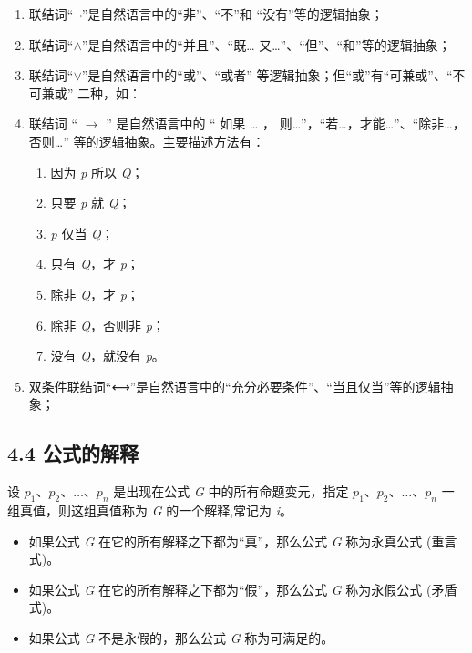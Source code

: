 \begin{enumerate}
\def\labelenumi{\arabic{enumi}.}
\tightlist
\item
  联结词``\(\lnot\)''是自然语言中的``非''、``不''和
  ``没有''等的逻辑抽象；
\item
  联结词``\(\land\)''是自然语言中的``并且''、``既\ldots{}
  又\ldots''、``但''、``和''等的逻辑抽象；
\item
  联结词``\(\lor\)''是自然语言中的``或''、``或者''
  等逻辑抽象；但``或''有``可兼或''、``不可兼或'' 二种，如：
\item
  联结词 `` \(\to\) '' 是自然语言中的 `` 如果 \ldots{} ，
  则\ldots''，``若\ldots，才能\ldots''、``除非\ldots，否则\ldots''
  等的逻辑抽象。主要描述方法有：

  \begin{enumerate}
  \def\labelenumii{\arabic{enumii}.}
  \tightlist
  \item
    因为 \emph{p} 所以 \emph{Q}；
  \item
    只要 \emph{p} 就 \emph{Q}；
  \item
    \emph{p} 仅当 \emph{Q}；
  \item
    只有 \emph{Q}，才 \emph{p}；
  \item
    除非 \emph{Q}，才 \emph{p}；
  \item
    除非 \emph{Q}，否则非 \emph{p}；
  \item
    没有 \emph{Q}，就没有 \emph{p}。
  \end{enumerate}
\item
  双条件联结词``⟷''是自然语言中的``充分必要条件''、``当且仅当''等的逻辑抽象；
\end{enumerate}

\subsection{4.4 公式的解释}\label{ux516cux5f0fux7684ux89e3ux91ca}

设 \(p_1、p_2、…、p_n\) 是出现在公式 \emph{G} 中的所有命题变元，指定
\(p_1、p_2、…、p_n\) 一组真值，则这组真值称为 \emph{G} 的一个解释,常记为
\emph{i}。

\begin{itemize}
\tightlist
\item
  如果公式 \emph{G} 在它的所有解释之下都为``真''，那么公式 \emph{G}
  称为永真公式 (重言式)。
\item
  如果公式 \emph{G} 在它的所有解释之下都为``假''，那么公式 \emph{G}
  称为永假公式 (矛盾式)。
\item
  如果公式 \emph{G} 不是永假的，那么公式 \emph{G} 称为可满足的。
\end{itemize}

